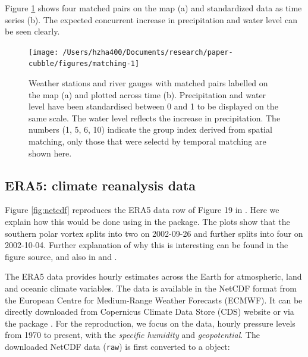 \documentclass[
  shortnames]{jss}
\begin{document}
Figure \ref{fig:matching} shows four matched pairs on the map (a) and standardized data as time series (b). The expected concurrent increase in precipitation and water level can be seen clearly.

\begin{CodeChunk}
\begin{figure}

{\centering \texttt{[image: /Users/hzha400/Documents/research/paper-cubble/figures/matching-1]} 

}

\caption[Weather stations and river gauges with matched pairs labelled on the map (a) and plotted across time (b)]{Weather stations and river gauges with matched pairs labelled on the map (a) and plotted across time (b). Precipitation and water level have been standardised between 0 and 1 to be displayed on the same scale. The water level reflects the increase in precipitation. The numbers (1, 5, 6, 10) indicate the group index derived from spatial matching, only those that were selectd by temporal matching are shown here.}\label{fig:matching}
\end{figure}
\end{CodeChunk}

\hypertarget{era5-climate-reanalysis-data}{%
\subsection{ERA5: climate reanalysis data}\label{era5-climate-reanalysis-data}}

Figure \ref{fig:netcdf} reproduces the ERA5 data row of Figure 19 in \citet{hersbach2020era5}. Here we explain how this would be done using in the  package. The plots show that the southern polar vortex splits into two on 2002-09-26 and further splits into four on 2002-10-04. Further explanation of why this is interesting can be found in the figure source, and also in \citet{simmons2020global} and \citet{simmons2005ecmwf}.

The ERA5 data \citep{hersbach2020era5} provides hourly estimates across the Earth for atmospheric, land and oceanic climate variables. The data is available in the NetCDF format from the European Centre for Medium-Range Weather Forecasts (ECMWF). It can be directly downloaded from Copernicus Climate Data Store (CDS) \citep{cds} website or via the  package \citep{ecwmfr}. For the reproduction, we focus on the  data, hourly pressure levels from 1970 to present, with the \emph{specific humidity} and \emph{geopotential}. The downloaded NetCDF data (\texttt{raw}) is first converted to a  object:
\end{document}
